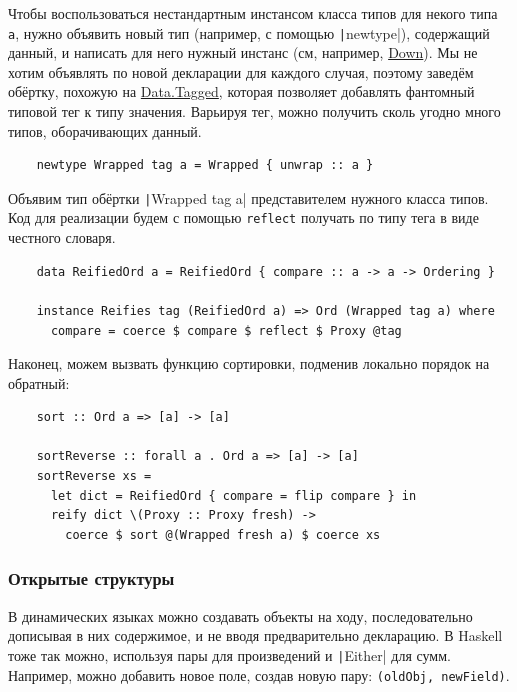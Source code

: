 Чтобы воспользоваться нестандартным инстансом класса типов для некого типа \texttt{a}, нужно объявить новый тип (например, с помощью \texttt|newtype|), содержащий данный, и написать для него нужный инстанс (см, например, \href{https://hackage.haskell.org/package/base-4.20.0.1/docs/Data-Ord.html#t:Down}{Down}).
Мы не хотим объявлять по новой декларации для каждого случая, поэтому заведём обёртку, похожую на \href{https://hackage.haskell.org/package/tagged-0.8.8/docs/Data-Tagged.html}{Data.Tagged}, которая позволяет добавлять фантомный типовой тег к типу значения.
Варьируя тег, можно получить сколь угодно много типов, оборачивающих данный.
\begin{verbatim}
    newtype Wrapped tag a = Wrapped { unwrap :: a }
\end{verbatim}

Объявим тип обёртки \texttt|Wrapped tag a| представителем нужного класса типов.
Код для реализации будем с помощью \texttt{reflect} получать по типу тега в виде честного словаря.
\begin{verbatim}
    data ReifiedOrd a = ReifiedOrd { compare :: a -> a -> Ordering }

    instance Reifies tag (ReifiedOrd a) => Ord (Wrapped tag a) where
      compare = coerce $ compare $ reflect $ Proxy @tag
\end{verbatim}

Наконец, можем вызвать функцию сортировки, подменив локально порядок на обратный:
\begin{verbatim}
    sort :: Ord a => [a] -> [a]

    sortReverse :: forall a . Ord a => [a] -> [a]
    sortReverse xs =
      let dict = ReifiedOrd { compare = flip compare } in
      reify dict \(Proxy :: Proxy fresh) ->
        coerce $ sort @(Wrapped fresh a) $ coerce xs
\end{verbatim}

\subsubsection{Открытые структуры}

В динамических языках можно создавать объекты на ходу, последовательно дописывая в них содержимое, и не вводя предварительно декларацию.
В Haskell тоже так можно, используя пары для произведений и \texttt|Either| для сумм.
Например, можно добавить новое поле, создав новую пару: \texttt{(oldObj, newField)}.

